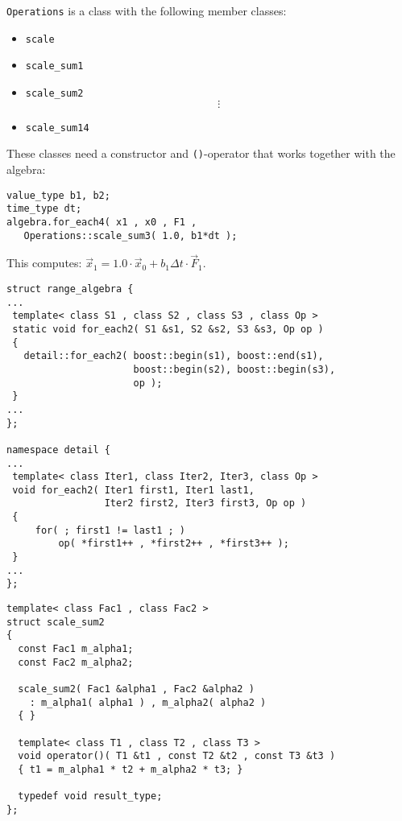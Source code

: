 \begin{frame}[fragile]

\lstinline+Operations+ is a class with the following member classes:
\begin{itemize}
 \item \lstinline+scale+
 \item \lstinline+scale_sum1+
 \item \lstinline+scale_sum2+
\[ \vdots \]
 \item \lstinline+scale_sum14+
\end{itemize}

These classes need a constructor and \lstinline+()+-operator that works together with the algebra:
\begin{lstlisting}
value_type b1, b2;
time_type dt;
algebra.for_each4( x1 , x0 , F1 ,
   Operations::scale_sum3( 1.0, b1*dt );
\end{lstlisting}

This computes: $\vec x_1 = 1.0\cdot \vec x_0 + b_1\Delta t\cdot \vec F_1$.
\end{frame}


\begin{frame}[fragile]

\begin{lstlisting}[basicstyle=\scriptsize]
struct range_algebra {
...
 template< class S1 , class S2 , class S3 , class Op >
 static void for_each2( S1 &s1, S2 &s2, S3 &s3, Op op )
 {
   detail::for_each2( boost::begin(s1), boost::end(s1),
                      boost::begin(s2), boost::begin(s3), 
                      op );
 }
...
};

namespace detail {
...
 template< class Iter1, class Iter2, Iter3, class Op >
 void for_each2( Iter1 first1, Iter1 last1, 
                 Iter2 first2, Iter3 first3, Op op )
 {
     for( ; first1 != last1 ; )
         op( *first1++ , *first2++ , *first3++ );
 }
...
};
\end{lstlisting}

\end{frame}


\begin{frame}[fragile]
\begin{lstlisting}
template< class Fac1 , class Fac2 >
struct scale_sum2
{
  const Fac1 m_alpha1;
  const Fac2 m_alpha2;

  scale_sum2( Fac1 &alpha1 , Fac2 &alpha2 ) 
    : m_alpha1( alpha1 ) , m_alpha2( alpha2 ) 
  { }

  template< class T1 , class T2 , class T3 >
  void operator()( T1 &t1 , const T2 &t2 , const T3 &t3 )
  { t1 = m_alpha1 * t2 + m_alpha2 * t3; }

  typedef void result_type;
};
\end{lstlisting}

\end{frame}

